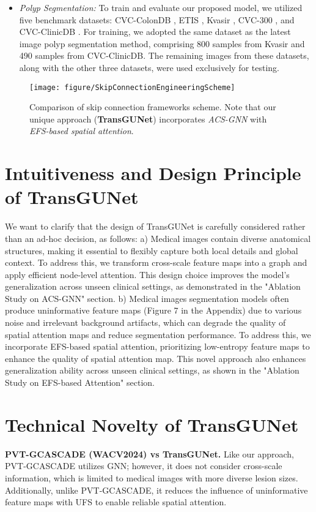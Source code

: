 \begin{itemize}
    \item \textit{Polyp Segmentation:} To train and evaluate our proposed model, we utilized five benchmark datasets: CVC-ColonDB \cite{tajbakhsh2015automated}, ETIS \cite{silva2014toward}, Kvasir \cite{jha2020kvasir}, CVC-300 \cite{vazquez2017benchmark}, and CVC-ClinicDB \cite{bernal2015wm}. For training, we adopted the same dataset as the latest image polyp segmentation method, comprising 800 samples from Kvasir and 490 samples from CVC-ClinicDB. The remaining images from these datasets, along with the other three datasets, were used exclusively for testing.
\end{itemize}

\begin{figure*}[t]
    \centering
    \texttt{[image: figure/SkipConnectionEngineeringScheme]}
    \caption{Comparison of skip connection frameworks scheme. Note that our unique approach (\textbf{TransGUNet}) incorporates \textit{ACS-GNN} with \textit{EFS-based spatial attention}.}
    \label{fig:SkipConnectionEngineeringScheme}
\end{figure*}

\section{Intuitiveness and Design Principle of TransGUNet}
We want to clarify that the design of TransGUNet is carefully considered rather than an ad-hoc decision, as follows: a) Medical images contain diverse anatomical structures, making it essential to flexibly capture both local details and global context. To address this, we transform cross-scale feature maps into a graph and apply efficient node-level attention. This design choice improves the model’s generalization across unseen clinical settings, as demonstrated in the "Ablation Study on ACS-GNN" section. b) Medical images segmentation models often produce uninformative feature maps (Figure 7 in the Appendix) due to various noise and irrelevant background artifacts, which can degrade the quality of spatial attention maps and reduce segmentation performance. To address this, we incorporate EFS-based spatial attention, prioritizing low-entropy feature maps to enhance the quality of spatial attention map. This novel approach also enhances generalization ability across unseen clinical settings, as shown in the "Ablation Study on EFS-based Attention" section.

\section{Technical Novelty of TransGUNet}
\noindent \textbf{PVT-GCASCADE (WACV2024) vs TransGUNet.} Like our approach, PVT-GCASCADE utilizes GNN; however, it does not consider cross-scale information, which is limited to medical images with more diverse lesion sizes. Additionally, unlike PVT-GCASCADE, it reduces the influence of uninformative feature maps with UFS to enable reliable spatial attention.

